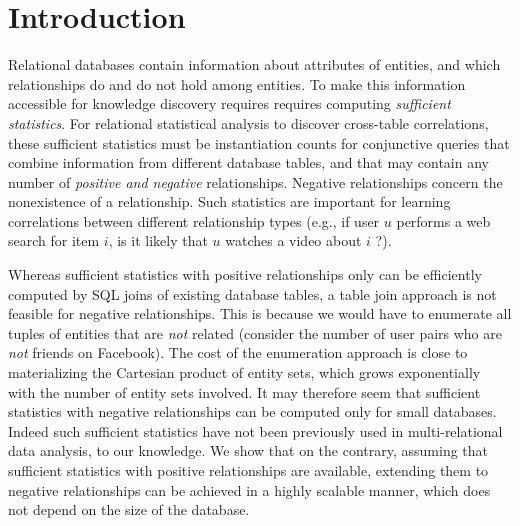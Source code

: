 \documentclass{acm_proc_article-sp}
\begin{document}
%

 
\section{Introduction} Relational databases contain information about attributes of entities, and which relationships do and do not hold among entities. To make this information accessible for knowledge discovery requires requires computing {\em sufficient statistics}. 
For relational statistical analysis to discover cross-table correlations, these sufficient statistics must be instantiation counts for conjunctive queries  that combine information from different database tables, and that may contain any number of {\em positive and negative} relationships. Negative relationships concern the nonexistence of a relationship. Such statistics are important for learning correlations between different relationship types (e.g., if user $u$ performs a web search for item $i$, is it likely that $u$ watches a video about $i$ ?). 

Whereas sufficient statistics with positive relationships only can be efficiently computed by SQL joins of existing database tables, a table join approach is not feasible for negative relationships. This is because we would have to enumerate all tuples of entities that are {\em not} related (consider the number of user pairs who are {\em not} friends on Facebook). The cost of the enumeration approach is close to materializing the Cartesian product of entity sets, which grows exponentially with the number of entity sets involved. It may therefore seem that sufficient statistics with negative relationships can be computed only for small databases. Indeed  such sufficient statistics have not been previously used in multi-relational data analysis, to our knowledge. We show that on the contrary, assuming that sufficient statistics with positive relationships are available, extending them to negative relationships can be achieved in a highly scalable manner, which does not depend on the size of the database.
\end{document}
